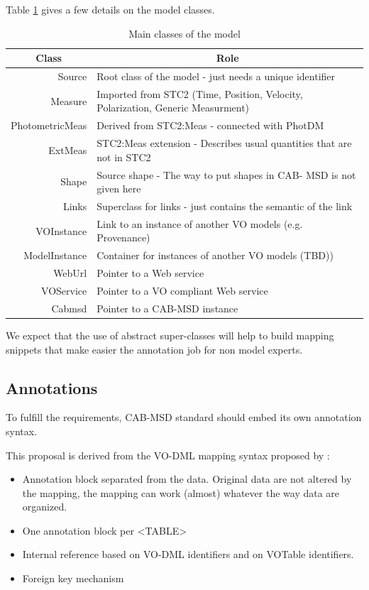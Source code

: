 \documentclass[11pt,a4paper]{ivoa}
\begin{document}
Table \ref{table:tclass} gives a few details on the model classes.

\begin{table}[!ht]
\begin{tabular}{|r|p{19em}|}
  \hline
          \multicolumn{1}{|c}{\bfseries Class} &
          \multicolumn{1}{|c|}{\bfseries Role}
          \\
\hline
Source & 
Root class of the model - just needs a unique identifier
\\  
\hline
Measure & 
Imported from STC2 (Time, Position, Velocity, Polarization, Generic Measurment)
\\
\hline
PhotometricMeas & 
Derived from STC2:Meas - connected with PhotDM 
\\
\hline
ExtMeas & 
STC2:Meas extension - Describes usual quantities that are not in STC2  
\\
\hline
Shape & 
Source shape - The way to put shapes in  CAB-
MSD is not given here
\\
\hline
Links & 
Superclass for links - just contains the semantic of the link
\\
\hline
VOInstance & 
Link to an instance of another VO models (e.g. Provenance)
\\
\hline
ModelInstance & 
Container for instances of another VO models (TBD))
\\
\hline
WebUrl & 
Pointer to a Web service 
\\
\hline
VOService & 
Pointer to a VO compliant Web service 
\\
\hline
Cabmsd & 
Pointer to a CAB-MSD instance 
\\
\hline
\end{tabular}
\caption{Main classes of the model}
\label{table:tclass}
\end{table}

We expect that the use of abstract super-classes will help to build mapping snippets that make easier the annotation job for non model experts.

\subsection{Annotations}

To fulfill the requirements,  CAB-MSD standard should embed its own annotation syntax. 

This proposal is derived from the VO-DML mapping syntax proposed by \citep{wd:wdmapping}:
\begin{itemize}
\item Annotation block separated from the data. Original data are not altered by the mapping, the mapping can work (almost)  whatever the way data are organized.
\item One annotation block per <TABLE>
\item Internal reference based on VO-DML identifiers and on VOTable identifiers.
\item Foreign key mechanism
\end{itemize}
\end{document}
